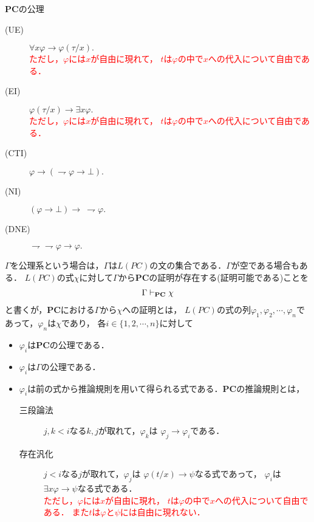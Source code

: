 \begin{description}
\begin{itembox}[l]{{\bf PC}の公理}
\begin{description}
			\item[(UE)] $\forall x \varphi \rightarrow \varphi(\tau/x).$
				\\ \textcolor{red}{ただし，$\varphi$には$x$が自由に現れて，
				$t$は$\varphi$の中で$x$への代入について自由である．}
				
			\item[(EI)] $\varphi(\tau/x) \rightarrow \exists x \varphi.$
				\\ \textcolor{red}{ただし，$\varphi$には$x$が自由に現れて，
				$t$は$\varphi$の中で$x$への代入について自由である．}
				
			\item[(CTI)] $\varphi \rightarrow (\rightharpoondown \varphi \rightarrow \bot).$
			
			\item[(NI)] $(\varphi \rightarrow \bot) \rightarrow\ \rightharpoondown \varphi.$
			\item[(DNE)] $\rightharpoondown \rightharpoondown \varphi \rightarrow \varphi.$
		\end{description}
	\end{itembox}
	
	$\Gamma$を公理系という場合は，$\Gamma$は$L(PC)$の文の集合である．$\Gamma$が空である場合もある．
	$L(PC)$の式$\chi$に対して$\Gamma$から{\bf PC}の証明が存在する(証明可能である)ことを
	\begin{align}
		\Gamma \vdash_{{\scriptsize \mbox{{\bf PC}}}} \chi
	\end{align}
	と書くが，{\bf PC}における$\Gamma$から$\chi$への証明とは，
	$L(PC)$の式の列$\varphi_{1},\varphi_{2},
	\cdots,\varphi_{n}$であって，$\varphi_{n}$は$\chi$であり，
	各$i \in \{1,2,\cdots,n\}$に対して
	\begin{itemize}
		\item $\varphi_{i}$は{\bf PC}の公理である．
		\item $\varphi_{i}$は$\Gamma$の公理である．
		\item $\varphi_{i}$は前の式から推論規則を用いて得られる式である．{\bf PC}の推論規則とは，
			\begin{description}
			\item[三段論法]
				$j,k < i$なる$k,j$が取れて，$\varphi_{k}$は
				$\varphi_{j} \rightarrow \varphi_{i}$である．
			 	
			\item[存在汎化] 
				$j < i$なる$j$が取れて，$\varphi_{j}$は
				$\varphi(t/x) \rightarrow \psi$なる式であって，
				$\varphi_{i}$は$\exists x \varphi \rightarrow \psi$なる式である．
				\\ \textcolor{red}{ただし，$\varphi$には$x$が自由に現れ，
				$t$は$\varphi$の中で$x$への代入について自由である．
				また$t$は$\varphi$と$\psi$には自由に現れない．}
			

\end{description}
\end{itemize}
\end{description}
